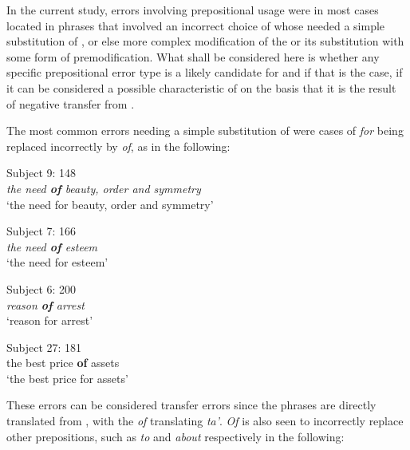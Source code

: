 \documentclass[output=paper]{langsci/langscibook}
\begin{document}
In the current study, errors involving prepositional usage were in
most cases located in %
phrases that
involved an incorrect choice of  whose  needed a
simple substitution of , or else more complex modification
of the  or its substitution with some form of
premodification. What shall be considered here is whether any specific
prepositional error type is a likely candidate for  and
if that is the case, if it can be considered a possible characteristic
of  on the basis that it is the result of negative
transfer from .



The most common errors needing a simple substitution of 
were cases of \textit{for} being replaced incorrectly by \textit{of},
as in the following:


\begin{exe}  
  \ex{}
  {Subject 9: 148}\\
    \textit{the need \textbf{of} beauty, order and symmetry}\\
    {‘the need for beauty, order and symmetry’}
  \label{ex16}
\end{exe}

\begin{exe}  
  \ex{}
  {Subject 7: 166}\\
    \textit{the need \textbf{of} esteem}\\
    {‘the need for esteem’}
  \label{ex17}
\end{exe}

\begin{exe}  
  \ex{}
  {Subject 6: 200}\\
    \textit{reason \textbf{of} arrest}\\
    {‘reason for arrest’}
  \label{ex18}
\end{exe}

\begin{exe}  
  \ex{}
  {Subject 27: 181}\\
    {the best price \textbf{of} assets}\\
    {‘the best price for assets’}
  \label{ex19}
\end{exe}


These errors can be considered transfer errors since the phrases are directly translated from , with the  \textit{of} translating \textit{ta’}. \textit{Of} is also seen to incorrectly replace other prepositions, such as \textit{to} and \textit{about} respectively in the following:
\end{document}
